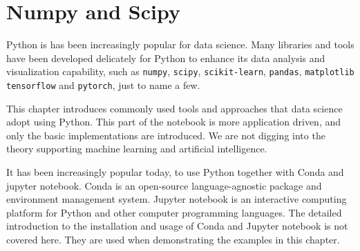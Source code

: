 \chapter{Numpy and Scipy} \label{ch:np}

Python is has been increasingly popular for data science. Many libraries and tools have been developed delicately for Python to enhance its data analysis and visualization capability, such as \verb|numpy|, \verb|scipy|, \verb|scikit-learn|, \verb|pandas|, \verb|matplotlib| \verb|tensorflow| and \verb|pytorch|, just to name a few.

This chapter introduces commonly used tools and approaches that data science adopt using Python. This part of the notebook is more application driven, and only the basic implementations are introduced. We are not digging into the theory supporting machine learning and artificial intelligence.

It has been increasingly popular today, to use Python together with Conda and jupyter notebook. Conda is an open-source language-agnostic package and environment management system. Jupyter notebook is an interactive computing platform for Python and other computer programming languages. The detailed introduction to the installation and usage of Conda and Jupyter notebook is not covered here. They are used when demonstrating the examples in this chapter.